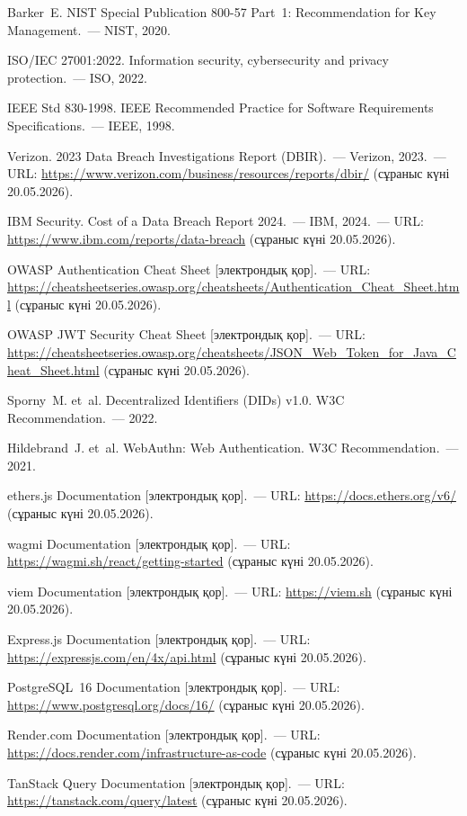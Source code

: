 \documentclass[14pt,a4paper]{extarticle}
\begin{document}
\begin{enumerate}[label={[\arabic*]}, nosep]
\item Barker~E. NIST Special Publication 800-57 Part~1: Recommendation for Key Management.~--- NIST, 2020.
\item ISO/IEC 27001:2022. Information security, cybersecurity and privacy protection.~--- ISO, 2022.
\item IEEE Std 830-1998. IEEE Recommended Practice for Software Requirements Specifications.~--- IEEE, 1998.
\item Verizon. 2023 Data Breach Investigations Report (DBIR).~--- Verizon, 2023.~--- URL: \url{https://www.verizon.com/business/resources/reports/dbir/} (сұраныс күні 20.05.2026).
\item IBM Security. Cost of a Data Breach Report 2024.~--- IBM, 2024.~--- URL: \url{https://www.ibm.com/reports/data-breach} (сұраныс күні 20.05.2026).
\item OWASP Authentication Cheat Sheet [электрондық қор].~--- URL: \url{https://cheatsheetseries.owasp.org/cheatsheets/Authentication_Cheat_Sheet.html} (сұраныс күні 20.05.2026).
\item OWASP JWT Security Cheat Sheet [электрондық қор].~--- URL: \url{https://cheatsheetseries.owasp.org/cheatsheets/JSON_Web_Token_for_Java_Cheat_Sheet.html} (сұраныс күні 20.05.2026).
\item Sporny~M. et~al. Decentralized Identifiers (DIDs) v1.0. W3C Recommendation.~--- 2022.
\item Hildebrand~J. et~al. WebAuthn: Web Authentication. W3C Recommendation.~--- 2021.
\item ethers.js Documentation [электрондық қор].~--- URL: \url{https://docs.ethers.org/v6/} (сұраныс күні 20.05.2026).
\item wagmi Documentation [электрондық қор].~--- URL: \url{https://wagmi.sh/react/getting-started} (сұраныс күні 20.05.2026).
\item viem Documentation [электрондық қор].~--- URL: \url{https://viem.sh} (сұраныс күні 20.05.2026).
\item Express.js Documentation [электрондық қор].~--- URL: \url{https://expressjs.com/en/4x/api.html} (сұраныс күні 20.05.2026).
\item PostgreSQL~16 Documentation [электрондық қор].~--- URL: \url{https://www.postgresql.org/docs/16/} (сұраныс күні 20.05.2026).
\item Render.com Documentation [электрондық қор].~--- URL: \url{https://docs.render.com/infrastructure-as-code} (сұраныс күні 20.05.2026).
\item TanStack Query Documentation [электрондық қор].~--- URL: \url{https://tanstack.com/query/latest} (сұраныс күні 20.05.2026).

\end{enumerate}
\end{document}
